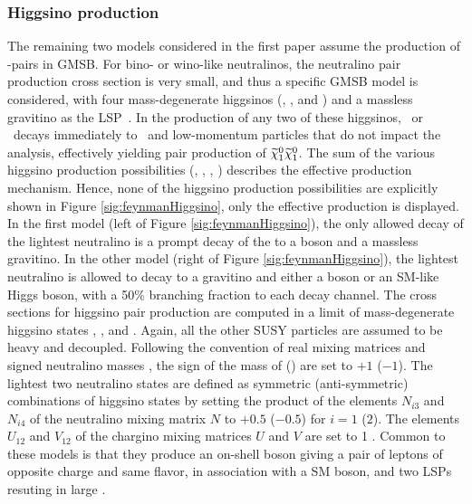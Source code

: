 \subsubsection*{Higgsino production}
\noindent\justify
The remaining two models considered in the first paper assume the production of \firstchi-\firstchi pairs in GMSB.
For bino- or wino-like neutralinos, the neutralino pair production cross section is very small, and thus a specific GMSB model is considered, with four mass-degenerate higgsinos (\firstcharg, \secondchi, and \firstchi) and a massless gravitino as the LSP~\cite{Matchev:1999ft,Meade:2009qv,Ruderman}.
In the production of any two of these higgsinos, \firstcharg\ or \secondchi\ decays immediately to \firstchi\ and low-momentum particles that do not impact the analysis, effectively yielding pair production of $\widetilde{\chi}^{0}_{1}\widetilde{\chi}^{0}_{1}$.
The sum of the various higgsino production possibilities (\firstcharg\secondchi, \firstchi\secondchi, \firstcharg\firstcharg, \firstcharg\firstchi) describes the effective \firstchi\firstchi production mechanism. 
Hence, none of the higgsino production possibilities are explicitly shown in Figure \ref{sig:feynmanHiggsino}, only the effective \firstchi\firstchi production is displayed.
In the first model (left of Figure \ref{sig:feynmanHiggsino}), the only allowed decay of the lightest neutralino is a prompt decay of the \firstchi to a \PZ boson and a massless gravitino.
\newpara
\noindent\justify
In the other model (right of Figure \ref{sig:feynmanHiggsino}), the lightest neutralino is allowed to decay to a gravitino and either a \PZ boson or an SM-like Higgs boson, with a 50\% branching fraction to each decay channel.
The cross sections for higgsino pair production are computed in a limit of mass-degenerate higgsino states \secondchi, \firstcharg, and \firstchi.
Again, all the other SUSY particles are assumed to be heavy and decoupled.
Following the convention of real mixing matrices and signed neutralino masses \cite{Skands:2003cj}, the sign of the mass of \firstchi (\secondchi) are set to $+1$ ($-1$).
The lightest two neutralino states are defined as symmetric (anti-symmetric) combinations of higgsino states by setting the product of the elements $N_{i3}$ and $N_{i4}$ of the neutralino mixing matrix $N$ to $+0.5$ ($-0.5$) for $i = 1$ ($2$).
The elements $U_{12}$ and $V_{12}$ of the chargino mixing matrices $U$ and $V$ are set to 1 \cite{Skands:2003cj}.
\newpara
\noindent\justify
Common to these models is that they produce an on-shell \PZ boson giving a pair of leptons of opposite charge and same flavor, in association with a SM boson, and two LSPs resuting in large \ptmiss. 

